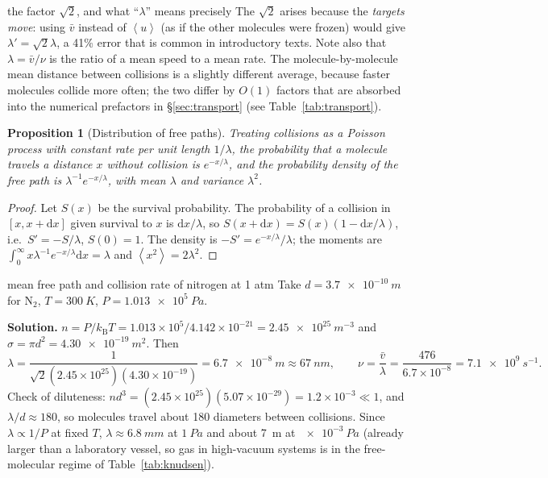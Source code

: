 \documentclass[11pt,a4paper]{report}
\theoremstyle{definition}
\theoremstyle{plain}
\newtheorem{proposition}[definition]{Proposition}
\newcommand{\kB}{k_{\mathrm{B}}}
\newcommand{\dd}{\mathrm{d}}
\newcommand{\avg}[1]{\left\langle #1\right\rangle}
\newcommand{\vbar}{\bar{v}}
\begin{document}
\begin{pitfall}{the factor $\sqrt2$, and what ``$\lambda$'' means precisely}
The $\sqrt2$ arises because the \emph{targets move}: using $\vbar$ instead of $\avg u$ (as if the other molecules were frozen) would give $\lambda'=\sqrt2\lambda$, a 41\% error that is common in introductory texts. Note also that $\lambda=\vbar/\nu$ is the ratio of a mean speed to a mean rate. The molecule-by-molecule mean distance between collisions is a slightly different average, because faster molecules collide more often; the two differ by $O(1)$ factors that are absorbed into the numerical prefactors in \S\ref{sec:transport} (see Table~\ref{tab:transport}).
\end{pitfall}

\begin{proposition}[Distribution of free paths]\label{prop:freepath}
Treating collisions as a Poisson process with constant rate per unit length $1/\lambda$, the probability that a molecule travels a distance $x$ without collision is $e^{-x/\lambda}$, and the probability density of the free path is $\lambda^{-1}e^{-x/\lambda}$, with mean $\lambda$ and variance $\lambda^2$.
\end{proposition}
\begin{proof}
Let $S(x)$ be the survival probability. The probability of a collision in $[x,x+\dd x]$ given survival to $x$ is $\dd x/\lambda$, so $S(x+\dd x)=S(x)(1-\dd x/\lambda)$, i.e.\ $S'=-S/\lambda$, $S(0)=1$. The density is $-S'=e^{-x/\lambda}/\lambda$; the moments are $\int_0^\infty x\lambda^{-1}e^{-x/\lambda}\dd x=\lambda$ and $\avg{x^2}=2\lambda^2$.
\end{proof}

\begin{workedex}{mean free path and collision rate of nitrogen at 1 atm}
\label{wex:mfp}
Take $d=\SI{3.7e-10}{m}$ for N$_2$, $T=\SI{300}{K}$, $P=\SI{1.013e5}{Pa}$.

\medskip\noindent\textbf{Solution.} $n=P/\kB T=1.013\times10^5/4.142\times10^{-21}=\SI{2.45e25}{m^{-3}}$ and $\sigma=\pi d^2=\SI{4.30e-19}{m^2}$. Then
\[
\lambda=\frac{1}{\sqrt2(2.45\times10^{25})(4.30\times10^{-19})}=\SI{6.7e-8}{m}\approx\SI{67}{nm},
\qquad \nu=\frac{\vbar}{\lambda}=\frac{476}{6.7\times10^{-8}}=\SI{7.1e9}{s^{-1}} .
\]
Check of diluteness: $nd^3=(2.45\times10^{25})(5.07\times10^{-29})=1.2\times10^{-3}\ll1$, and $\lambda/d\approx180$, so molecules travel about 180 diameters between collisions. Since $\lambda\propto1/P$ at fixed $T$, $\lambda\approx\SI{6.8}{mm}$ at $\SI{1}{Pa}$ and about \SI{7}{m} at $\SI{e-3}{Pa}$ (already larger than a laboratory vessel, so gas in high-vacuum systems is in the free-molecular regime of Table~\ref{tab:knudsen}).
\end{workedex}
\end{document}
